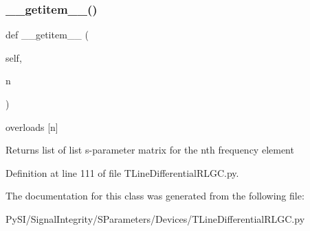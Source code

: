 \subsubsection{\texorpdfstring{\+\_\+\+\_\+getitem\+\_\+\+\_\+()}{\_\_getitem\_\_()}}
{\footnotesize\ttfamily def \+\_\+\+\_\+getitem\+\_\+\+\_\+ (\begin{DoxyParamCaption}\item[{}]{self,  }\item[{}]{n }\end{DoxyParamCaption})}



overloads \mbox{[}n\mbox{]} 

\begin{DoxyReturn}{Returns}
list of list s-\/parameter matrix for the nth frequency element 
\end{DoxyReturn}


Definition at line 111 of file T\+Line\+Differential\+R\+L\+G\+C.\+py.



The documentation for this class was generated from the following file\+:\begin{DoxyCompactItemize}
\item 
Py\+S\+I/\+Signal\+Integrity/\+S\+Parameters/\+Devices/T\+Line\+Differential\+R\+L\+G\+C.\+py\end{DoxyCompactItemize}

